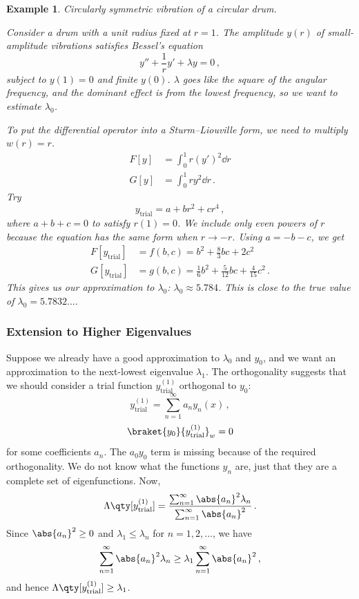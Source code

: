 \documentclass{article}
\theoremstyle{plain}\theoremheaderfont{\normalfont\itshape}\theorembodyfont{\rmfamily}\theoremseparator{.}\newtheorem*{rem}{Remark}\newtheorem*{ex}{Example}\newtheorem*{proof}{Proof}\newtheorem*{altp}{Alternative proof}
\theoremstyle{plain}\theoremheaderfont{\normalfont\bfseries}\theorembodyfont{\rmfamily}\theoremseparator{.}\newtheorem{thm}{Theorem}[section]\newtheorem{lem}[thm]{Lemma}\newtheorem{prop}[thm]{Proposition}\newtheorem*{cor}{Corollary}\newtheorem{defn}[thm]{Definition}\newtheorem{clm}[thm]{Claim}\newtheorem{clminproof}{Claim}
\theoremstyle{break}\theoremheaderfont{\normalfont\itshape}\theorembodyfont{\rmfamily}\theoremseparator{.\medskip}\newtheorem*{proofskip}{Proof}\newtheorem*{exs}{Examples}\newtheorem*{rems}{Remarks}
\theoremstyle{break}\theoremheaderfont{\normalfont\bfseries}\theorembodyfont{\rmfamily}\theoremseparator{.\medskip}\newtheorem{lemskip}[thm]{Lemma}\newtheorem{defnskip}[thm]{Definition}\newtheorem{propskip}[thm]{Proposition}\newtheorem{thmskip}[thm]{Theorem}
\numberwithin{equation}{section}
\begin{document}
	\begin{ex}
		\textit{Circularly symmetric vibration of a circular drum.}
		
		Consider a drum with a unit radius fixed at \(r=1\). The amplitude \(y(r)\) of small-amplitude vibrations satisfies \textit{Bessel's equation}
		\[y''+\frac{1}{r}y'+\lambda y=0\,,\]
		subject to \(y(1)=0\) and finite \(y(0)\). \(\lambda\) goes like the square of the angular frequency, and the dominant effect is from the lowest frequency, so we want to estimate \(\lambda_0\).
		
		To put the differential operator into a Sturm--Liouville form, we need to multiply \(w(r)=r\).
		\begin{align*}
			F[y]&=\int_{0}^{1}r(y')^2\dd{r}\\
			G[y]&=\int_{0}^{1}ry^2\dd{r}\,.
		\end{align*}
		Try
		\[y_\text{trial}=a+br^2+cr^4\,,\]
		where \(a+b+c=0\) to satisfy \(r(1)=0\). We include only even powers of \(r\) because the equation has the same form when \(r\to -r\). Using \(a=-b-c\), we get
		\begin{align*}
			F[y_\text{trial}]&=f(b,c)=b^2+\frac{8}{3}bc+2c^2\\
			G[y_\text{trial}]&=g(b,c)=\frac{1}{6}b^2+\frac{5}{12}bc+\frac{4}{15}c^2\,.
		\end{align*}
		This gives us our approximation to \(\lambda_0\): \(\lambda_0\approx5.784\). This is close to the true value of \(\lambda_0=5.7832\dots\).
	\end{ex}
	
	\subsubsection{Extension to Higher Eigenvalues}
	Suppose we already have a good approximation to \(\lambda_0\) and \(y_0\), and we want an approximation to the next-lowest eigenvalue \(\lambda_1\). The orthogonality suggests that we should consider a trial function \(y_\text{trial}^{(1)}\) orthogonal to \(y_0\):
	\[y_\text{trial}^{(1)}=\sum_{n=1}^{\infty}a_n y_n(x)\,,\]
	\[\braket{y_0}{y_\text{trial}^{(1)}}_w=0\]
	for some coefficients \(a_n\). The \(a_0y_0\) term is missing because of the required orthogonality. We do not know what the functions \(y_n\) are, just that they are a complete set of eigenfunctions. Now,
	\[\Lambda\qty[y_\text{trial}^{(1)}]=\frac{\sum_{n=1}^{\infty}\abs{a_n}^2\lambda_n}{\sum_{n=1}^{\infty}\abs{a_n}^2}\,.\]
	Since \(\abs{a_n}^2\ge 0\) and \(\lambda_1\le \lambda_n\) for \(n=1,2,\dots\), we have
	\[\sum_{n=1}^{\infty}\abs{a_n}^2\lambda_n\ge\lambda_1\sum_{n=1}^{\infty}\abs{a_n}^2\,,\]
	and hence \(\Lambda\qty[y_\text{trial}^{(1)}]\ge\lambda_1\).
\end{document}

